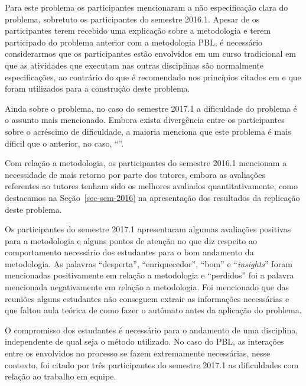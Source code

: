 Para este problema os participantes mencionaram a não especificação clara
do problema, sobretuto os participantes do semestre 2016.1.
Apesar de os participantes terem recebido
uma explicação sobre a metodologia e terem participado
do problema anterior com a metodologia PBL, é necessário considerarmos
que os participantes estão envolvidos em um curso tradicional
em que as atividades que executam nas outras disciplinas são normalmente
especificações, ao contrário do que é recomendado nos princípios citados
em \cite{dolmans1997seven} e que foram utilizados para
a construção deste problema.

Ainda sobre o problema, no caso do semestre 2017.1 a dificuldade
do problema é o assunto mais mencionado.
Embora exista divergência entre os participantes
sobre o acréscimo de dificuldade, a maioria menciona que este
problema é mais díficil que o anterior, no caso, ``\ProblemaG''.

Com relação a metodologia, os participantes do semestre 2016.1
mencionam a necessidade de mais retorno por parte dos tutores,
embora as avaliações referentes ao tutores tenham sido
os melhores avaliados quantitativamente, como destacamos
na Seção~\ref{sec-sem-2016} na apresentação dos resultados
da replicação deste problema.

Os participantes do semestre 2017.1
apresentaram algumas avaliações positivas para a metodologia
e alguns pontos de atenção no que diz respeito ao
comportamento necessário dos estudantes para o bom
andamento da metodologia.
As palavras ``desperta'', ``enriquecedor'', ``bom'' e ``\textit{insights}''
foram mencionadas positivamente em relação a metodologia e ``perdidos''
foi a palavra mencionada negativamente em relação a metodologia.
Foi mencionado que das reuniões alguns estudantes não conseguem
extrair as informações necessárias e que faltou aula teórica
de como fazer o autômato antes da aplicação do problema.

O compromisso dos estudantes é necessário para
o andamento de uma disciplina, independente de qual seja
o método utilizado.
No caso do PBL, as interações entre os envolvidos no processo
se fazem extremamente necessárias, nesse contexto,
foi citado por três participantes do semestre 2017.1 as dificuldades
com relação ao trabalho em equipe.

\subsection{\ProblemaC}

